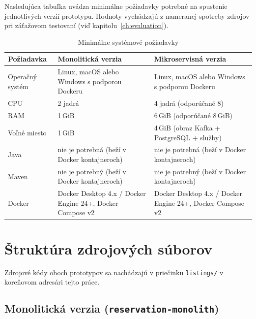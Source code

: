 Nasledujúca tabuľka uvádza minimálne požiadavky potrebné na spustenie jednotlivých verzií prototypu. Hodnoty vychádzajú z nameranej spotreby zdrojov pri záťažovom testovaní (viď kapitolu~\ref{ch:evaluation}).

\begin{table}[H]
\centering
\begin{tabular}{|l|p{}|p{}|}
\hline
\textbf{Požiadavka} & \textbf{Monolitická verzia} & \textbf{Mikroservisná verzia} \\ \hline
Operačný systém  & Linux, macOS alebo Windows s podporou Dockeru & Linux, macOS alebo Windows s podporou Dockeru \\ \hline
CPU              & 2 jadrá & 4 jadrá (odporúčané 8) \\ \hline
RAM              & 1\,GiB & 6\,GiB (odporúčané 8\,GiB) \\ \hline
Voľné miesto     & 1\,GiB & 4\,GiB (obraz Kafka + PostgreSQL + služby) \\ \hline
Java             & nie je potrebná (beží v Docker kontajneroch) & nie je potrebná (beží v Docker kontajneroch) \\ \hline
Maven            & nie je potrebný (beží v Docker kontajneroch) & nie je potrebný (beží v Docker kontajneroch) \\ \hline
Docker           & Docker Desktop 4.x / Docker Engine 24+, Docker Compose v2 & Docker Desktop 4.x / Docker Engine 24+, Docker Compose v2 \\ \hline
\end{tabular}
\caption{Minimálne systémové požiadavky}
\label{tab:system-requirements}
\end{table}

\section{Štruktúra zdrojových súborov}

Zdrojové kódy oboch prototypov sa nachádzajú v priečinku \texttt{listings/} v koreňovom adresári tejto práce.

\subsection*{Monolitická verzia (\texttt{reservation-monolith})}

